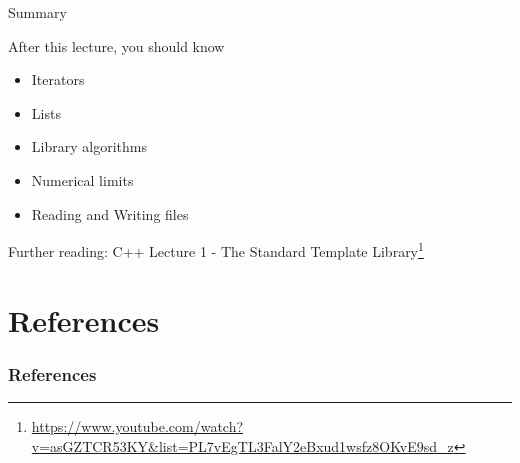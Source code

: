 \documentclass[12pt,t]{beamer}
\begin{document}
\begin{frame}{Summary}
\begin{block}{After this lecture, you should know}
\begin{itemize}
\item Iterators
\item Lists
\item Library algorithms
\item Numerical limits
\item Reading and Writing files
\end{itemize}
\end{block}

\begin{block}{Further reading:}
C++ Lecture 1 - The Standard Template Library\footnote{\tiny\url{https://www.youtube.com/watch?v=asGZTCR53KY&list=PL7vEgTL3FalY2eBxud1wsfz8OKvE9sd_z}}
\end{block}


\end{frame}


\section{References}

\begin{frame}[t, allowframebreaks]
\frametitle{References}


\end{frame}
\end{document}

